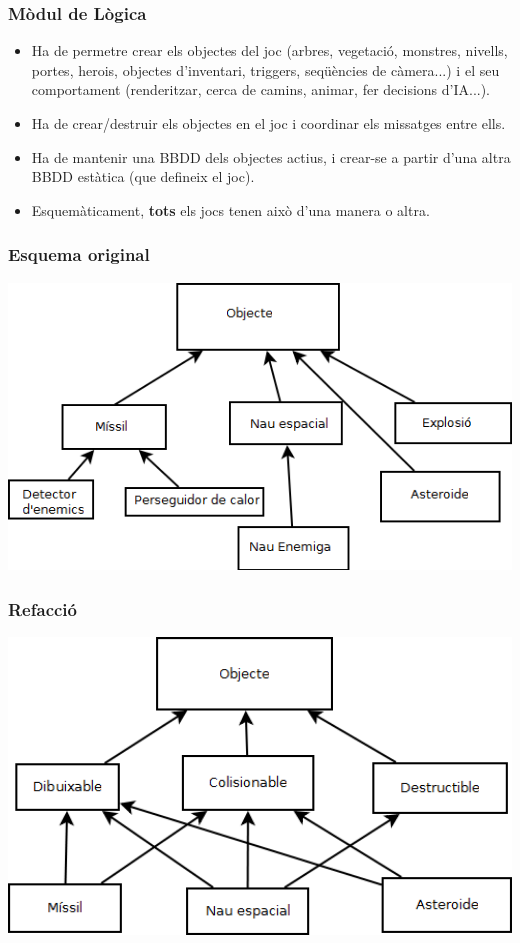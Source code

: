 \documentclass[serif,9pt]{beamer}
\begin{document}
    \begin{frame}\frametitle{Mòdul de Lògica}
      \begin{itemize}
        \item Ha de permetre crear els objectes del joc (arbres, vegetació, monstres, nivells, portes, herois, objectes d'inventari, triggers, seqüències de càmera...) i el seu comportament (renderitzar, cerca de camins, animar, fer decisions d'IA...).\bigskip
        \item Ha de crear/destruir els objectes en el joc i coordinar els missatges entre ells.\bigskip
        \item Ha de mantenir una BBDD dels objectes actius, i crear-se a partir d'una altra BBDD estàtica (que defineix el joc).\bigskip
        \item Esquemàticament, {\bf tots} els jocs tenen això d'una manera o altra.
      \end{itemize}
    \end{frame}

    \begin{frame}\frametitle{Esquema original}
      \includegraphics[width=1.00\textwidth]{./img/DiagramaObjectes1.png}
    \end{frame}

    \begin{frame}\frametitle{Refacció}
      \includegraphics[width=1.00\textwidth]{./img/DiagramaObjectes2.png}
    \end{frame}
\end{document}
